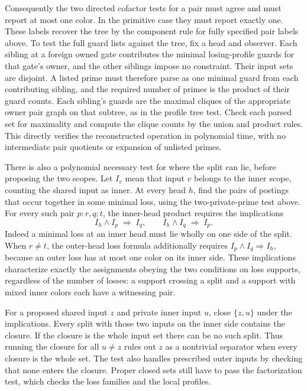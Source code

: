 Consequently the two directed cofactor tests for a pair must
agree and must report at most one color. In the primitive
case they must report exactly one. These labels recover the
tree by the component rule for fully specified pair labels
above. To test the full guard lists against the tree, fix a
head and observer. Each sibling at a foreign owned gate
contributes the minimal losing-profile guards for that gate's
owner, and the other siblings impose no constraint. Their
input sets are disjoint. A listed prime must therefore parse
as one minimal guard from each contributing sibling, and
the required number of primes is the product of their
guard counts. Each sibling's guards are the maximal cliques
of the appropriate owner pair graph on that subtree, as in
the profile tree test. Check each parsed set for maximality
and compute the clique counts by the union and product rules.
This directly verifies the reconstructed operation in
polynomial time, with no intermediate pair quotients or
expansion of unlisted primes.

There is also a polynomial necessary test for where the split can
lie, before proposing the two scopes. Let $I_v$ mean that input
$v$ belongs to the inner scope, counting the shared input as inner.
At every head $h$, find the pairs of postings that occur together
in some minimal loss, using the two-private-prime test above.
For every such pair $p:r,q:t$, the inner-head product requires
the implications
\[
  I_h\land I_p\;\Longrightarrow\; I_q,
  \qquad
  I_h\land I_q\;\Longrightarrow\; I_p.
\]
Indeed a minimal loss at an inner head must lie wholly on one
side of the split. When $r\ne t$, the outer-head loss formula
additionally requires $I_p\land I_q\Longrightarrow I_h$,
because an outer loss has at most one color on its inner side.
These implications characterize exactly the assignments obeying
the two conditions on loss supports, regardless of the number of
losses: a support crossing a split and a support with mixed inner
colors each have a witnessing pair.

For a proposed shared input $z$ and private inner input $u$,
close $\{z,u\}$ under the implications. Every split with those
two inputs on the inner side contains the closure. If the closure
is the whole input set there can be no such split. Thus running
the closure for all $u\ne z$ rules out $z$ as a nontrivial
separator when every closure is the whole set. The test also
handles prescribed outer inputs by checking that none enters the
closure. Proper closed sets still have to pass the factorization
test, which checks the loss families and the local profiles.

